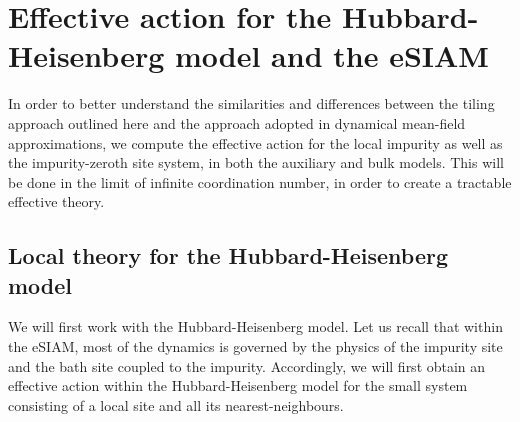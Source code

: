 \documentclass[reprint,hidelinks,onecolumn]{revtex4-2}
\begin{document}
\section{Effective action for the Hubbard-Heisenberg model and the eSIAM}
In order to better understand the similarities and differences between the tiling approach outlined here and the approach adopted in dynamical mean-field approximations, we compute the effective action for the local impurity as well as the impurity-zeroth site system, in both the auxiliary and bulk models. This will be done in the limit of infinite coordination number, in order to create a tractable effective theory.

\subsection{Local theory for the Hubbard-Heisenberg model}
We will first work with the Hubbard-Heisenberg model. Let us recall that within the eSIAM, most of the dynamics is governed by the physics of the impurity site and the bath site coupled to the impurity. Accordingly, we will first obtain an effective action within the Hubbard-Heisenberg model for the small system consisting of a local site and all its nearest-neighbours. 
\end{document}
